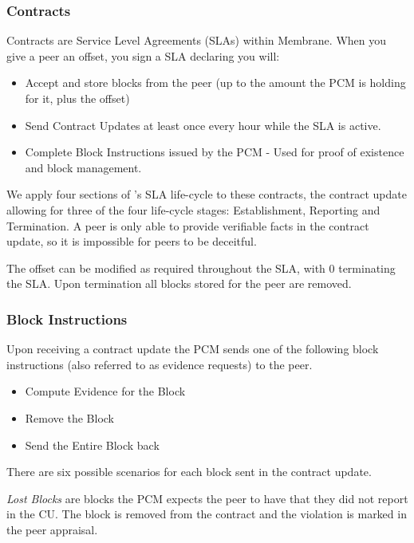 \documentclass[11pt, a4paper, twoside]{report}
\begin{document}
\subsubsection{Contracts}

Contracts are Service Level Agreements (SLAs) within Membrane. When you give a peer an offset, you sign a SLA declaring you will:

\begin{itemize}
 \item Accept and store blocks from the peer (up to the amount the PCM is holding for it, plus the offset)
 \item Send Contract Updates at least once every hour while the SLA is active.
 \item Complete Block Instructions issued by the PCM - Used for proof of existence and block management.
\end{itemize}

We apply four sections of \cite{keller2002defining}'s SLA life-cycle to these contracts, the contract update allowing for three of the four life-cycle stages: Establishment, Reporting and Termination. A peer is only able to provide verifiable facts in the contract update, so it is impossible for peers to be deceitful.

The offset can be modified as required throughout the SLA, with 0 terminating the SLA. Upon termination all blocks stored for the peer are removed.

\subsubsection{Block Instructions}

Upon receiving a contract update the PCM sends one of the following block instructions (also referred to as evidence requests) to the peer.

\begin{itemize}
  \item Compute Evidence for the Block
  \item Remove the Block
  \item Send the Entire Block back
\end{itemize}

There are six possible scenarios for each block sent in the contract update.

\emph{Lost Blocks} are blocks the PCM expects the peer to have that they did not report in the CU. The block is removed from the contract and the violation is marked in the peer appraisal.
\end{document}
